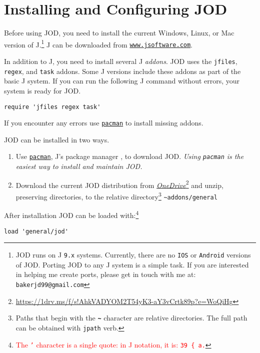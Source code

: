\section{Installing and Configuring JOD}\label{ss:jodcfgdesc}

Before using JOD, you need to install the current Windows, Linux, or Mac version of J.\footnote{JOD runs on 
 J \texttt{9.x} systems. Currently, there are no \texttt{IOS} or \texttt{Android} versions of JOD. Porting JOD 
to any J system is a simple task.
If you are interested in helping me create ports, please get in touch with me at:  
\texttt{bakerjd99@gmail.com}
} J can be downloaded from \href{https://www.jsoftware.com}{\texttt{www.jsoftware.com}}.

In addition to J, you need to install several J \emph{addons}. JOD uses the
\texttt{jfiles}, \texttt{regex}, and \texttt{task} addons.  Some J versions
include these addons as part of the basic J system. If you can run the following J command
without errors, your system is ready for JOD. 
\begin{lstlisting}[frame=single,framerule=0pt,label=lst:reqaddons]
   require 'jfiles regex task'
\end{lstlisting}
If you encounter any errors  use \href{https://code.jsoftware.com/wiki/Pacman}{\texttt{pacman}} to install 
missing addons.
 
JOD can be installed in two ways.  
\begin{enumerate}
	\item Use \href{https://code.jsoftware.com/wiki/Pacman}{\texttt{pacman}}, J's package manager 
	\cite{jwiki:pacman}, to download JOD. \emph{Using \texttt{pacman} is the easiest way to install and maintain JOD.}
	\item Download the current JOD distribution from \href{https://1drv.ms/f/s!AhkVADYOM2T54yK3-aY3vCrtk89p?e=WoQiHg}{\emph{OneDrive}}\footnote{\href{https://1drv.ms/f/s!AhkVADYOM2T54yK3-aY3vCrtk89p?e=WoQiHg}{https://1drv.ms/f/s!AhkVADYOM2T54yK3-aY3vCrtk89p?e=WoQiHg}} and unzip, preserving directories, to the relative directory\footnote{Paths that begin with the \textbf{\texttt{\~}} character are relative directories. The full path can be obtained with \texttt{jpath} verb. } \verb|~addons/general|
\end{enumerate}

After installation JOD can be loaded with:\footnote{\textcolor{red}{The \texttt{'} character 
is a single quote: in J notation, it is: \texttt{39 \{ a.}}
}
\begin{lstlisting}[frame=single,framerule=0pt,label=lst:loadjod00]
   load 'general/jod'
\end{lstlisting}

